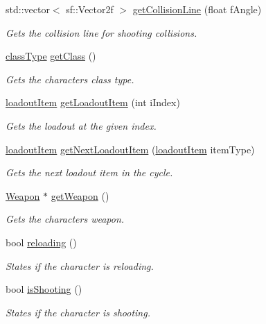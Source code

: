 \begin{DoxyCompactItemize}
std\+::vector$<$ sf\+::\+Vector2f $>$ \hyperlink{class_character_ac74c4792b54211057448be3e5de5c8cc}{get\+Collision\+Line} (float f\+Angle)
\begin{DoxyCompactList}\small\item\em Gets the collision line for shooting collisions. \end{DoxyCompactList}\item 
\hyperlink{_weapon_8h_ab84a9103ee8e782337e098ae19af7a29}{class\+Type} \hyperlink{class_character_ac007885afee1d0d6e91a4aabe57cda27}{get\+Class} ()
\begin{DoxyCompactList}\small\item\em Gets the characters class type. \end{DoxyCompactList}\item 
\hyperlink{_character_8h_a00971beaa8e80879643e933973580d61}{loadout\+Item} \hyperlink{class_character_ac1ba1ec695a358e504aefdbd8b4b2552}{get\+Loadout\+Item} (int i\+Index)
\begin{DoxyCompactList}\small\item\em Gets the loadout at the given index. \end{DoxyCompactList}\item 
\hyperlink{_character_8h_a00971beaa8e80879643e933973580d61}{loadout\+Item} \hyperlink{class_character_a2faad0be62bac6958cf6a9acab3f1f92}{get\+Next\+Loadout\+Item} (\hyperlink{_character_8h_a00971beaa8e80879643e933973580d61}{loadout\+Item} item\+Type)
\begin{DoxyCompactList}\small\item\em Gets the next loadout item in the cycle. \end{DoxyCompactList}\item 
\hyperlink{class_weapon}{Weapon} $\ast$ \hyperlink{class_character_a46e4df688f2a4b6ec9368ada9445aa66}{get\+Weapon} ()
\begin{DoxyCompactList}\small\item\em Gets the characters weapon. \end{DoxyCompactList}\item 
bool \hyperlink{class_character_ad92a87727c942a1ff05e09cceaca1398}{reloading} ()
\begin{DoxyCompactList}\small\item\em States if the character is reloading. \end{DoxyCompactList}\item 
bool \hyperlink{class_character_ad0f38e40696e54180a5cd49622480afb}{is\+Shooting} ()
\begin{DoxyCompactList}\small\item\em States if the character is shooting. \end{DoxyCompactList}\item 

\end{DoxyCompactItemize}
